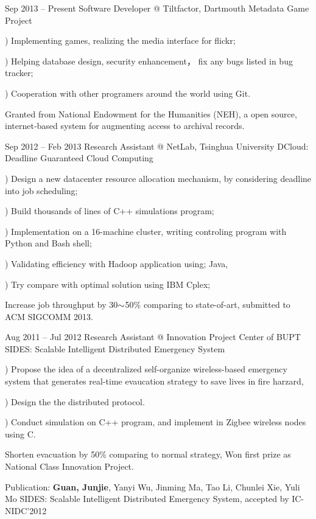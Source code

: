 \documentclass{tccv}
\begin{document}
\begin{eventlist}

\item{Sep 2013 -- Present}
     {Software Developer @ Tiltfactor, Dartmouth}
     {Metadata Game Project}
     
     ) Implementing games, realizing the media interface for flickr;
     
     ) Helping database design, security enhancement， fix any bugs listed in bug tracker;
     
     ) Cooperation with other programers around the world using Git.
     
     Granted from National Endowment for the Humanities (NEH), a open source, internet‐based system for augmenting access to archival records.
     
     
\item{Sep 2012 -- Feb 2013}
     {Research Assistant @ NetLab, Tsinghua University}
     {DCloud: Deadline Guaranteed Cloud Computing}
     
     ) Design a new datacenter resource allocation mechanism, by considering deadline into job scheduling;
     
     ) Build thousands of lines of C++ simulations program;
     
     ) Implementation on a 16-machine cluster, writing controling  program with Python and Bash shell;
     
     ) Validating efficiency with Hadoop application using; Java, 
     
     ) Try compare with optimal solution using IBM Cplex;

     Increase job throughput by 30$\scriptsize{\sim}$50\% comparing to state-of-art, submitted to ACM SIGCOMM 2013.
     
\item{Aug 2011 -- Jul 2012}
     {Research Assistant @ Innovation Project Center of BUPT}
     {SIDES: Scalable Intelligent Distributed Emergency System}
     
     ) Propose the idea of a decentralized self-organize wireless-based emergency system that generates real-time evaucation strategy to save lives in fire harzard, 
     
     ) Design the the distributed protocol.
     
     ) Conduct simulation on C++ program, and implement in Zigbee wireless nodes using C.
     
Shorten evacuation by 50\% comparing to normal strategy, Won first prize as National Class Innovation Project.

Publication: \textbf{Guan, Junjie}, Yanyi Wu, Jinming Ma, Tao Li, Chunlei Xie, Yuli Mo SIDES: Scalable Intelligent Distributed Emergency System, accepted by IC-NIDC’2012
     
\end{eventlist}
\end{document}
